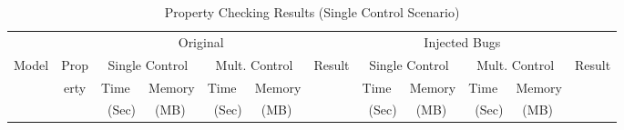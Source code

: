 \documentclass[submission,copyright,creativecommons]{eptcs}
\begin{document}
\begin{table}[ht]
\centering
\caption{Property Checking Results (Single Control Scenario)}
\label{Table_PROPERTY_CEHCKING}
\scriptsize
\begin{tabular}{|p{0.35in}|p{0.20in}|p{0.3in}|p{0.4in}|p{0.3in}|p{0.4in}|p{0.3in}|p{0.3in}|p{0.4in}|p{0.3in}|p{0.4in}|p{0.3in}|}\hline

\multicolumn{1}{|c|}{} & \multicolumn{1}{c|}{}  & \multicolumn{4}{c|}{Original}& \multicolumn{1}{c}{} &\multicolumn{4}{|c}{Injected Bugs} &\multicolumn{1}{|c|}{}\\ \cline{3-6} \cline{8-11} 

 \multicolumn{1}{|c|}{Model} & \multicolumn{1}{c|}{Prop} & \multicolumn{2}{c|}{Single Control}  & \multicolumn{2}{c}{Mult. Control}&  \multicolumn{1}{|c|}{Result} &\multicolumn{2}{c|}{Single Control}& \multicolumn{2}{c|}{Mult. Control}&\multicolumn{1}{c|}{Result} \\ \cline{3-6} \cline{8-11}

&\multicolumn{1}{c|}{erty}& {Time} & {Memory} & {Time} & {Memory} &   &{Time} & {Memory} & {Time} & {Memory}&{}\\ & \multicolumn{1}{c|}{}& {~(Sec)} & {~(MB)} & {~(Sec)} & {~(MB)} &&{~(Sec)} & {~(MB)} & {~(Sec)} & {~(MB)}& \multicolumn{1}{c|}{}\\ \hline\hline


\end{tabular}
\end{table}
\end{document}
